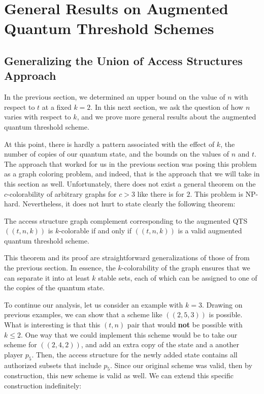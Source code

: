\chapter{General Results on Augmented Quantum Threshold Schemes}

\section{Generalizing the Union of Access Structures Approach}

In the previous section, we determined an upper bound on the value of $n$ with respect to $t$ at a fixed $k=2$. In this next section, we ask the question of how $n$ varies with respect to $k$, and we prove more general results about the augmented quantum threshold scheme. 

At this point, there is hardly a pattern associated with the effect of $k$, the number of copies of our quantum state, and the bounds on the values of $n$ and $t$. The approach that worked for us in the previous section was posing this problem as a graph coloring problem, and indeed, that is the approach that we will take in this section as well. Unfortunately, there does not exist a general theorem on the $c$-colorability of arbitrary graphs for $c > 3$ like there is for $2$. This problem is NP-hard. Nevertheless, it does not hurt to state clearly the following theorem:

\begin{lemma}
    \label{lem:k-color-access}
    The access structure graph complement corresponding to the augmented QTS $((t,n,k))$ is $k$-colorable if and only if $((t,n,k))$ is a valid augmented quantum threshold scheme.
\end{lemma}

This theorem and its proof are straightforward generalizations of those of  from the previous section. In essence, the $k$-colorability of the graph ensures that we can separate it into at least $k$ stable sets, each of which can be assigned to one of the copies of the quantum state.

To continue our analysis, let us consider an example with $k=3$. Drawing on previous examples, we can show that a scheme like $((2,5,3))$ is possible. What is interesting is that this $(t,n)$ pair that would \textbf{not} be possible with $k \leq 2$. One way that we could implement this scheme would be to take our scheme for $((2,4,2))$, and add an extra copy of the state and a another player $p_5$. Then, the access structure for the newly added state contains all authorized subsets that include $p_5$. Since our original scheme was valid, then by construction, this new scheme is valid as well. We can extend this specific construction indefinitely:

